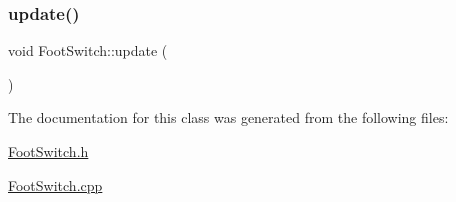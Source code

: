 \subsubsection{\texorpdfstring{update()}{update()}}
{\footnotesize\ttfamily void Foot\+Switch\+::update (\begin{DoxyParamCaption}{ }\end{DoxyParamCaption})}



The documentation for this class was generated from the following files\+:\begin{DoxyCompactItemize}
\item 
\mbox{\hyperlink{_foot_switch_8h}{Foot\+Switch.\+h}}\item 
\mbox{\hyperlink{_foot_switch_8cpp}{Foot\+Switch.\+cpp}}\end{DoxyCompactItemize}
